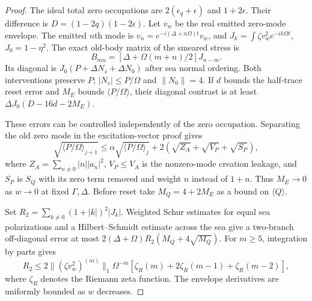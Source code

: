 \begin{proof}
The ideal total zero occupations are $2(\epsilon_q+\epsilon)$
and $1+2\epsilon$. Their difference is
$D=(1-2q)(1-2\epsilon)$. Let $v_w$ be the real emitted zero-mode
envelope. The emitted $n$th mode is
$v_n=e^{-i(\Delta+n\Omega)t}v_w$, and
$J_k=\int\zeta v_w^2e^{-ik\Omega t}$, $J_0=1-\eta^2$.
The exact old-body matrix of the smeared stress is
\[
 B_{mn}=[\Delta+\Omega(m+n)/2]J_{n-m}.
\]
Its diagonal is $J_0(P+\Delta N_s+\Delta N_0)$ after sea normal
ordering. Both interventions preserve $P$; $|N_s|\le P/\Omega$ and
$\|N_0\|=4$. If $d$ bounds the half-trace reset error and $M_E$
bounds $\langle P/\Omega\rangle$, their diagonal contrast is at least
$\Delta J_0(D-16d-2M_E)$.

These errors can be controlled independently of the zero occupation.
Separating the old zero mode in the excitation-vector proof gives
\[
 \sqrt{\langle P/\Omega\rangle_{j+1}}
 \le\alpha\sqrt{\langle P/\Omega\rangle_j}
       +2(\sqrt{Z_A}+\sqrt{V_P}+\sqrt{S_P}),
\]
where $Z_A=\sum_{n\ne0}|n||a_n|^2$, $V_P\le V_A$ is the
nonzero-mode creation leakage, and $S_P$ is $S_Q$ with its zero term
removed and weight $n$ instead of $1+n$. Thus $M_E\to0$ as
$w\to0$ at fixed $\Gamma,\Delta$. Before reset take
$M_Q=4+2M_E$ as a bound on $\langle Q\rangle$.

Set $R_2=\sum_{k\ne0}(1+|k|)^2|J_k|$. Weighted Schur estimates for
equal sea polarizations and a Hilbert--Schmidt estimate across the
sea give a two-branch off-diagonal error at most
$2(\Delta+\Omega)R_2(M_Q+4\sqrt{M_Q})$.
For $m\ge5$, integration by parts gives
\[
 R_2\le2\|(\zeta v_w^2)^{(m)}\|_1\Omega^{-m}
                   [\zeta_R(m)+2\zeta_R(m-1)+\zeta_R(m-2)],
\]
where $\zeta_R$ denotes the Riemann zeta function. The envelope
derivatives are uniformly bounded as $w$ decreases.


\end{proof}

